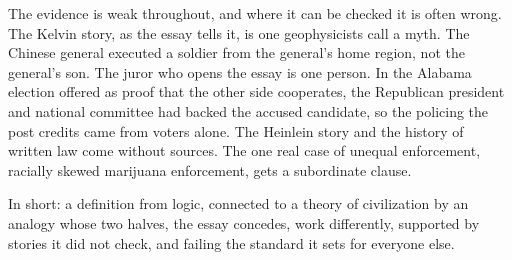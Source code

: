 \begin{afterword}
The evidence is weak throughout, and where it can be checked it is often wrong. The Kelvin story, as the essay tells it, is one geophysicists call a myth. The Chinese general executed a soldier from the general's home region, not the general's son. The juror who opens the essay is one person. In the Alabama election offered as proof that the other side cooperates, the Republican president and national committee had backed the accused candidate, so the policing the post credits came from voters alone. The Heinlein story and the history of written law come without sources. The one real case of unequal enforcement, racially skewed marijuana enforcement, gets a subordinate clause.

In short: a definition from logic, connected to a theory of civilization by an analogy whose two halves, the essay concedes, work differently, supported by stories it did not check, and failing the standard it sets for everyone else.
\end{afterword}
